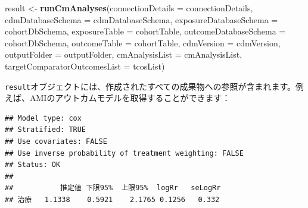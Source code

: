\documentclass[
  11pt]{book}
\newenvironment{Shaded}{\begin{snugshade}}{\end{snugshade}}
\newcommand{\AttributeTok}[1]{\textcolor[rgb]{0.13,0.29,0.53}{#1}}
\newcommand{\DecValTok}[1]{\textcolor[rgb]{0.00,0.00,0.81}{#1}}
\newcommand{\FunctionTok}[1]{\textcolor[rgb]{0.13,0.29,0.53}{\textbf{#1}}}
\newcommand{\NormalTok}[1]{#1}
\newcommand{\OtherTok}[1]{\textcolor[rgb]{0.56,0.35,0.01}{#1}}
\newcommand{\SpecialCharTok}[1]{\textcolor[rgb]{0.81,0.36,0.00}{\textbf{#1}}}
\theoremstyle{definition}
\theoremstyle{definition}
\theoremstyle{definition}
\theoremstyle{definition}
\theoremstyle{remark}
\begin{document}
\begin{Shaded}
\begin{Highlighting}[]
\NormalTok{result }\OtherTok{\textless{}{-}} \FunctionTok{runCmAnalyses}\NormalTok{(}\AttributeTok{connectionDetails =}\NormalTok{ connectionDetails,}
                        \AttributeTok{cdmDatabaseSchema =}\NormalTok{ cdmDatabaseSchema,}
                        \AttributeTok{exposureDatabaseSchema =}\NormalTok{ cohortDbSchema,}
                        \AttributeTok{exposureTable =}\NormalTok{ cohortTable,}
                        \AttributeTok{outcomeDatabaseSchema =}\NormalTok{ cohortDbSchema,}
                        \AttributeTok{outcomeTable =}\NormalTok{ cohortTable,}
                        \AttributeTok{cdmVersion =}\NormalTok{ cdmVersion,}
                        \AttributeTok{outputFolder =}\NormalTok{ outputFolder,}
                        \AttributeTok{cmAnalysisList =}\NormalTok{ cmAnalysisList,}
                        \AttributeTok{targetComparatorOutcomesList =}\NormalTok{ tcosList)}
\end{Highlighting}
\end{Shaded}

\texttt{result}オブジェクトには、作成されたすべての成果物への参照が含まれます。例えば、AMIのアウトカムモデルを取得することができます：

\begin{Shaded}
\end{Shaded}

\begin{verbatim}
## Model type: cox
## Stratified: TRUE
## Use covariates: FALSE
## Use inverse probability of treatment weighting: FALSE
## Status: OK
## 
##           推定値 下限95%  上限95%  logRr   seLogRr
## 治療   1.1338    0.5921    2.1765 0.1256   0.332
\end{verbatim}
\end{document}
